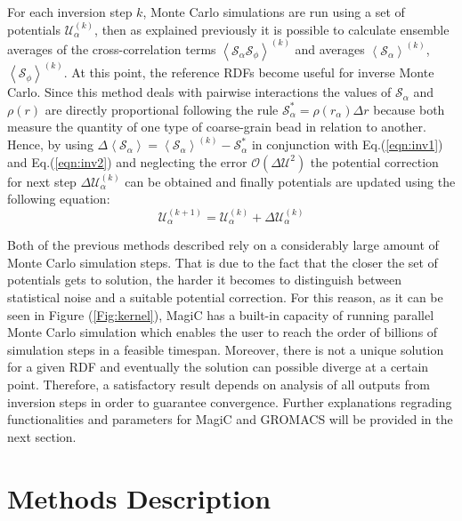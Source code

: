\documentclass[10pt,a4paper,twoside]{article}
\begin{document}
For each inversion step $k$, Monte Carlo simulations are run using a set of potentials $\mathcal{U}_{\alpha}^{(k)}$, then as explained previously it is possible to calculate ensemble averages of the cross-correlation terms ${\left\langle\mathcal{S}_\alpha\mathcal{S}_\phi\right\rangle}^{(k)}$ and averages $\left\langle\mathcal{S}_\alpha\right\rangle^{(k)}$, $\left\langle\mathcal{S}_\phi\right\rangle^{(k)}$. At this point, the reference RDFs become useful for inverse Monte Carlo. Since this method deals with pairwise interactions the values of $\mathcal{S}_\alpha$ and $\rho(r)$ are directly proportional following the rule $\mathcal{S}_\alpha^{*}= \rho(r_\alpha)\Delta r $ \cite{magic} because both measure the quantity of one type of coarse-grain bead in relation to another. Hence, by using $\Delta\left\langle\mathcal{S}_\alpha\right\rangle = \left\langle\mathcal{S}_\alpha\right\rangle^{(k)} - \mathcal{S}_\alpha^{*}$  in conjunction with Eq.(\ref{eqn:inv1}) and Eq.(\ref{eqn:inv2}) and neglecting the error $\mathcal{O}({\Delta\mathcal{U}}^2)$ the potential correction for next step $\Delta\mathcal{U}_\alpha^{(k)}$ can be obtained and finally potentials are updated using the following  equation:
 \begin{equation}
\mathcal{U}_\alpha^{(k+1)}= \mathcal{U}_\alpha^{(k)}+\Delta\mathcal{U}_\alpha^{(k)}
\label{eqn:potup}
\end{equation} 

Both of the previous methods described rely on a considerably large amount of Monte Carlo simulation steps. That is due to the fact that the closer the set of potentials gets to solution, the harder it becomes to distinguish between statistical noise and a suitable potential correction. For this reason, as it can be seen in Figure (\ref{Fig:kernel}), MagiC has a built-in capacity of running parallel Monte Carlo simulation which enables the user to reach the order of billions of simulation steps in a feasible timespan. Moreover, there is not a unique solution for a given RDF \cite{ibi} and eventually the solution can possible diverge at a certain point. Therefore, a satisfactory result depends on analysis of all outputs from inversion steps in order to guarantee convergence. Further explanations regrading functionalities and parameters for MagiC and GROMACS will be provided in the next section.   
 
\section{Methods Description} 
\end{document}
